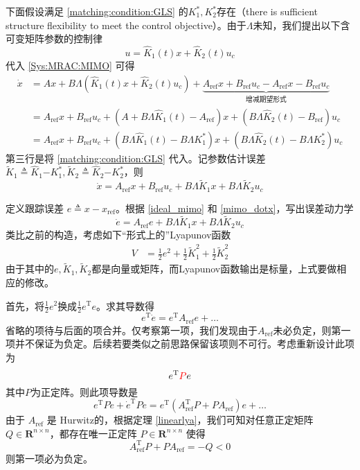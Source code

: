 下面假设满足 \eqref{matching:condition:GLS} 的$K^{\ast}_1, K^{\ast}_2$存在（there is sufficient structure flexibility to meet the control
objective）。由于$\Lambda$未知，我们提出以下含可变矩阵参数的控制律
\[ u = \hat{K}_1 (t) x + \hat{K}_2 (t) u_c \]
代入 \eqref{Sys:MRAC:MIMO} 可得
\begin{align}
    \dot{x}&=A  x + B \Lambda (\hat{K}_1 (t) x + \hat{K}_2 (t) u_c)+
    \underbrace{A_{\ensuremath{\operatorname{ref}}} x +
    B_{\ensuremath{\operatorname{ref}}} u_c-A_{\ensuremath{\operatorname{ref}}} x -
    B_{\ensuremath{\operatorname{ref}}} u_c}_{\text{增减期望形式}}\nonumber\\
    &=A_{\ensuremath{\operatorname{ref}}} x +
    B_{\ensuremath{\operatorname{ref}}} u_c+(A + B \Lambda \hat{K}_1 (t)-A_{\ensuremath{\operatorname{ref}}}) x+(B\Lambda\hat{K}_2 (t)-B_{\ensuremath{\operatorname{ref}}}) u_c\nonumber\\
    &=A_{\ensuremath{\operatorname{ref}}} x +
    B_{\ensuremath{\operatorname{ref}}} u_c+(B \Lambda \hat{K}_1 (t)-B \Lambda K^{\ast}_1) x+(B\Lambda\hat{K}_2 (t)-B \Lambda K^{\ast}_2) u_c\label{mimo_dotx}
\end{align}
第三行是将 \eqref{matching:condition:GLS} 代入。记参数估计误差 $\tilde{K}_1 \triangleq \hat{K}_1 {- K_1^{\ast}} , \tilde{K}_2
\triangleq \hat{K}_2 {- K_2^{\ast}} $，则
\[ \dot{x} = A_{\ensuremath{\operatorname{ref}}}  x +
   B_{\ensuremath{\operatorname{ref}}} u_c + B \Lambda  \tilde{K}_1 x + B
   \Lambda  \tilde{K}_2 u_c \]

定义跟踪误差 $e \triangleq x -
x_{\ensuremath{\operatorname{ref}}}$。根据 \eqref{ideal_mimo} 和 \eqref{mimo_dotx}，写出误差动力学
\begin{equation}
  \dot{e} = A_{\ensuremath{\operatorname{ref}}} e + B \Lambda  \tilde{K}_1 x +
  B \Lambda  \tilde{K}_2 u_c \label{errsys:MRAC:GLS}
\end{equation}
类比之前的构造，考虑如下“形式上的”Lyapunov函数
\begin{align*}
  V&=\frac12e^2+\frac{1}{2}\tilde{K}_1^2+\frac{1}{2}\tilde{K}_2^2
\end{align*}
由于其中的$e,\tilde{K}_1,\tilde{K}_2$都是向量或矩阵，而Lyapunov函数输出是标量，上式要做相应的修改。

首先，将$\frac12e^2$换成$\frac12e^\mathrm{T}e$。求其导数得\[e^\mathrm{T}\dot{e}=e^\mathrm{T}A_{\ensuremath{\operatorname{ref}}} e+\dots\]
省略的项待与后面的项合并。仅考察第一项，我们发现由于$A_{\ensuremath{\operatorname{ref}}}$未必负定，则第一项并不保证为负定。后续若要类似之前思路保留该项则不可行。考虑重新设计此项为\[e^\mathrm{T}\textcolor{red}{P}e\]
其中$P$为正定阵。则此项导数是
\[e^\mathrm{T}P\dot{e}+\dot{e}^\mathrm{T}Pe=e^\mathrm{T}(A_{\ensuremath{\operatorname{ref}}}^\mathrm{T} P + P A_{\ensuremath{\operatorname{ref}}}) e+\dots\]
由于 $A_{\ensuremath{\operatorname{ref}}}$ 是 Hurwitz的，根据定理 \ref{linearlya}，我们可知对任意正定矩阵 $Q \in \mathbf{R}^{n \times
n}$，都存在唯一正定阵 $P \in \mathbf{R}^{n \times n}$
使得
\[ A_{\ensuremath{\operatorname{ref}}}^\mathrm{T} P + P 
   A_{\ensuremath{\operatorname{ref}}} = - Q < 0 \]
则第一项必为负定。

